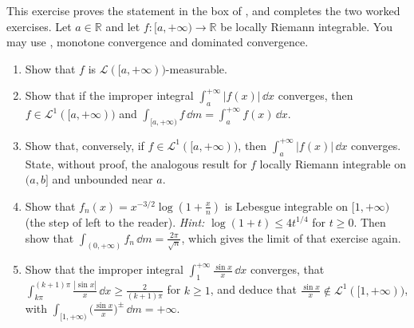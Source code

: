 \begin{exercise}\label{ex:ig-improper}
\medium This exercise proves the statement in the box of , and
completes the two worked exercises. Let $a\in\mathbb R$ and let $f:[a,+\infty)\to\mathbb R$ be
locally Riemann integrable. You may use , monotone convergence and
dominated convergence.
\begin{enumerate}[label=(\alph*)]
  \item Show that $f$ is $\mathcal L([a,+\infty))$-measurable.
  \item Show that if the improper integral $\int_a^{+\infty}|f(x)|\,\dd x$ converges, then
    $f\in\mathcal L^1([a,+\infty))$ and $\int_{[a,+\infty)}f\,\dd m=\int_a^{+\infty}f(x)\,\dd x$.
  \item Show that, conversely, if $f\in\mathcal L^1([a,+\infty))$, then
    $\int_a^{+\infty}|f(x)|\,\dd x$ converges. State, without proof, the analogous result for
    $f$ locally Riemann integrable on $(a,b]$ and unbounded near $a$.
  \item Show that $f_n(x)=x^{-3/2}\log(1+\frac xn)$ is Lebesgue integrable on $[1,+\infty)$
    (the step of  left to the reader). \emph{Hint:}
    $\log(1+t)\le4t^{1/4}$ for $t\ge0$. Then show that
    $\int_{(0,+\infty)}f_n\,\dd m=\frac{2\pi}{\sqrt n}$, which gives the limit of that exercise
    again.
  \item Show that the improper integral $\int_1^{+\infty}\frac{\sin x}x\,\dd x$ converges, that
    $\int_{k\pi}^{(k+1)\pi}\frac{|\sin x|}x\,\dd x\ge\frac2{(k+1)\pi}$ for $k\ge1$, and deduce that
    $\frac{\sin x}x\notin\mathcal L^1([1,+\infty))$, with
    $\int_{[1,+\infty)}\big(\frac{\sin x}x\big)^\pm\,\dd m=+\infty$.
\end{enumerate}
\end{exercise}

